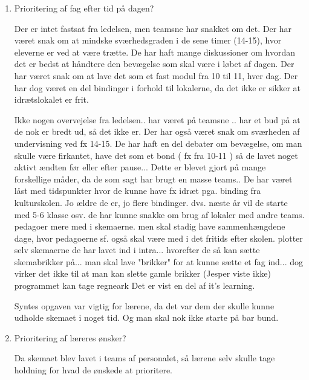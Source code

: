 \begin{enumerate}
	\item Prioritering af fag efter tid på dagen?
	
	Der er intet fastsat fra ledelsen, men teamsne har snakket om det. Der har været snak om at mindske sværhedsgraden i de sene timer (14-15), hvor eleverne er ved at være trætte. De har haft mange diskussioner om hvordan det er bedst at håndtere den bevægelse som skal være i løbet af dagen. Der har været snak om at lave det som et fast modul fra 10 til 11, hver dag. Der har dog været en del bindinger i forhold til lokalerne, da det ikke er sikker at idrætslokalet er frit.
	
	\noindent\makebox[\linewidth]{\rule{\paperwidth}{0.4pt}}
	Ikke nogen overvejelse fra ledelsen.. har været på teamsne .. har et bud på at de nok er bredt ud, så det ikke er. Der har også været snak om sværheden af undervisning ved fx 14-15. De har haft en del debater om bevægelse, om man skulle være firkantet, have det som et bond ( fx fra 10-11 )  så de lavet noget aktivt ændten før eller efter pause... Dette er blevet gjort på mange forskellige måder, da de som sagt har brugt en masse teams.. De har været låst med tidspunkter hvor de kunne have fx idræt pga. binding fra kulturskolen. Jo ældre de er, jo flere bindinger.  dvs. næste år vil de starte med 5-6 klasse osv. de har kunne snakke om brug af lokaler med andre teams. pedagoer mere med i skemaerne. men skal stadig have sammenhængdene dage, hvor pedagoerne sf. også skal være med i det fritids efter skolen. plotter selv skemaerne de har lavet ind i intra... hvorefter de så kan sætte skemabrikker på... man skal lave "brikker" for at kunne sætte et fag ind... dog virker det ikke til at man kan slette gamle brikker (Jesper viste ikke)
	programmet kan tage regneark Det er vist en del af it's learning. 

	Syntes opgaven var vigtig for lærene, da det var dem der skulle kunne udholde skemaet i noget tid. Og man skal nok ikke starte på bar bund. 
	\noindent\makebox[\linewidth]{\rule{\paperwidth}{0.4pt}}
	\item Prioritering af læreres ønsker?

	Da skemaet blev lavet i teams af personalet, så lærene selv skulle tage holdning for hvad de ønskede at prioritere.  
	
\end{enumerate}